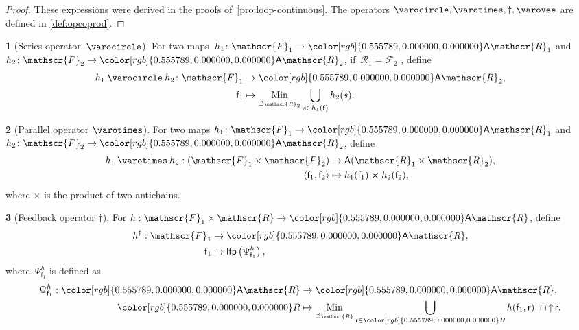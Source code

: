 \documentclass[twocolumn,english]{IEEEtran}
\theoremstyle{definition}
\newtheorem{defn}{\protect\definitionname}
\theoremstyle{plain}
\theoremstyle{definition}
\theoremstyle{remark}
\theoremstyle{definition}
\theoremstyle{plain}
\theoremstyle{plain}
\newcommand{\aword}[1]{\mathsf{#1}}
\newcommand{\vmath}[1]{\aword{#1}}
\DeclareMathOperator*{\Min}{Min}
\newcommand{\posleq}{\preceq}
\newcommand{\lfp}{\vmath{lfp}}
\newcommand{\antichains}{\vmath{A}}
\newcommand{\upit}{{\uparrow\,}}
\newcommand{\ftor}{{h}}
\newcommand{\funsp}{\mathscr{F}}
\newcommand{\fun}{\vmath{f}}
\newcommand{\res}{\vmath{r}}
\newcommand{\ressp}{\mathscr{R}}
\newcommand{\Aressp}{{\antichains\ressp}}
\newcommand{\acprod}{\mathbin{\boldsymbol{\times}}}
\newcommand{\oploop}{\dagger}
\newcommand{\opseries}{\mathbin{\varocircle}}
\newcommand{\oppar}{\mathbin{\varotimes}}
\newcommand{\opcoprod}{\mathbin{\varovee}}
\newcommand{\colR}{\color[rgb]{0.555789,0.000000,0.000000}}
\renewcommand{\Aressp}{{\colR\antichains\ressp}}
\providecommand{\definitionname}{Definition}
\begin{document}
\begin{proof}
These expressions were derived in the proofs of~\textendash \ref{pro:loop-continuous}.
 The operators $\opseries,\oppar,\oploop,\opcoprod$ are defined
in \textendash \ref{def:opcoprod}. 
\end{proof}
\begin{defn}[Series operator~$\opseries$]
\label{def:opseries}For two maps~$\ftor_{1}\colon\funsp_{1}\rightarrow\Aressp_{1}$
and~$\ftor_{2}\colon\funsp_{2}\rightarrow\Aressp_{2}$, if~$\ressp_{1}=\funsp_{2}$
, define
\begin{align*}
{\displaystyle \ftor_{1}\opseries\ftor_{2}\colon\funsp_{1}} & \rightarrow\Aressp_{2},\\
\fun_{1} & \mapsto\Min_{\posleq_{\ressp_{2}}}\bigcup_{s\in\ftor_{1}(\fun)}\ftor_{2}(s).
\end{align*}
\end{defn}

\begin{defn}[Parallel operator $\oppar$]
\label{def:opmaps}For two maps $\ftor_{1}\colon\funsp_{1}\rightarrow\Aressp_{1}$
and $\ftor_{2}\colon\funsp_{2}\rightarrow\Aressp_{2}$, define
\begin{align}
\ftor_{1}\oppar\ftor_{2}:(\funsp_{1}\times\funsp_{2}) & \rightarrow\antichains(\ressp_{1}\times\ressp_{2}),\label{eq:oppar}\\
\left\langle \fun_{1},\fun_{2}\right\rangle  & \mapsto\ftor_{1}(\fun_{1})\acprod\ftor_{2}(\fun_{2}),\nonumber 
\end{align}
where $\acprod$ is the product of two antichains.
\end{defn}

\begin{defn}[Feedback operator $\oploop$]
\label{def:oploop}For $\ftor:\funsp_{1}\times\ressp\rightarrow\Aressp$,
define
\begin{align}
\ftor^{\oploop}:\funsp_{1} & \rightarrow\Aressp,\nonumber \\
\fun_{1} & \mapsto\lfp\left(\Psi_{\fun_{1}}^{\ftor}\right),\label{eq:lfp}
\end{align}
where~$\Psi_{\fun_{1}}^{\ftor}$ is defined as
\begin{align}
\Psi_{\fun_{1}}^{\ftor}:\Aressp & \rightarrow\Aressp,\nonumber \\
{\colR R} & \mapsto\Min_{\posleq_{\ressp}}\bigcup_{\res\in{\colR R}}\ftor(\fun_{1},\res)\ \cap\upit\res.\label{eq:phi}
\end{align}
\end{defn}
\end{document}
